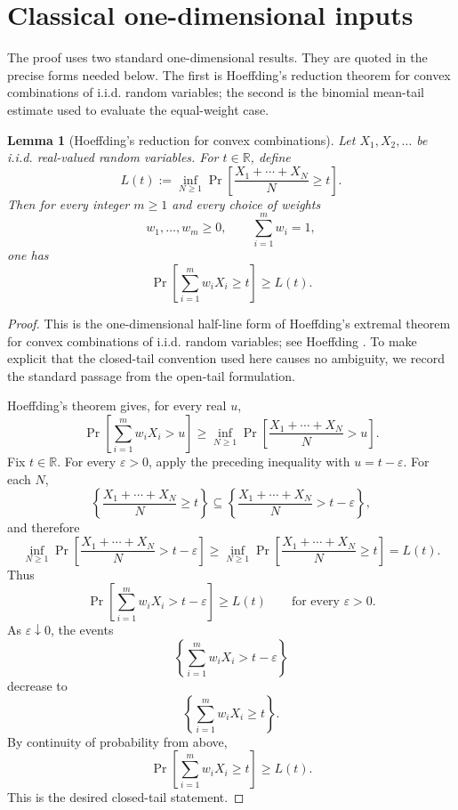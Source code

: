 \documentclass[12pt]{article}
\theoremstyle{definition}
\theoremstyle{plain}
\newtheorem{lemma}[definition]{Lemma}
\theoremstyle{remark}
\begin{document}
\section{Classical one-dimensional inputs}

The proof uses two standard one-dimensional results. They are quoted in the precise forms needed below. The first is Hoeffding's reduction theorem for convex combinations of i.i.d. random variables; the second is the binomial mean-tail estimate used to evaluate the equal-weight case.

\begin{lemma}[Hoeffding's reduction for convex combinations]\label{lem:hoeffding}
Let \(X_1,X_2,\ldots\) be i.i.d. real-valued random variables. For \(t\in\mathbb R\), define
\[
L(t):=\inf_{N\ge1}
\Pr\!\left[\frac{X_1+\cdots+X_N}{N}\ge t\right].
\]
Then for every integer \(m\ge1\) and every choice of weights
\[
w_1,\ldots,w_m\ge0,\qquad \sum_{i=1}^{m}w_i=1,
\]
one has
\[
\Pr\!\left[\sum_{i=1}^{m} w_iX_i\ge t\right]\ge L(t).
\]
\end{lemma}

\begin{proof}
This is the one-dimensional half-line form of Hoeffding's extremal theorem for convex combinations of i.i.d. random variables; see Hoeffding \cite{Hoeffding1955}. To make explicit that the closed-tail convention used here causes no ambiguity, we record the standard passage from the open-tail formulation.

Hoeffding's theorem gives, for every real \(u\),
\[
\Pr\!\left[\sum_{i=1}^{m}w_iX_i>u\right]
\ge
\inf_{N\ge1}
\Pr\!\left[\frac{X_1+\cdots+X_N}{N}>u\right].
\]
Fix \(t\in\mathbb R\). For every \(\varepsilon>0\), apply the preceding inequality with \(u=t-\varepsilon\). For each \(N\),
\[
\left\{\frac{X_1+\cdots+X_N}{N}\ge t\right\}
\subseteq
\left\{\frac{X_1+\cdots+X_N}{N}>t-\varepsilon\right\},
\]
and therefore
\[
\inf_{N\ge1}
\Pr\!\left[\frac{X_1+\cdots+X_N}{N}>t-\varepsilon\right]
\ge
\inf_{N\ge1}
\Pr\!\left[\frac{X_1+\cdots+X_N}{N}\ge t\right]
=L(t).
\]
Thus
\[
\Pr\!\left[\sum_{i=1}^{m}w_iX_i>t-\varepsilon\right]\ge L(t)
\qquad\text{for every }\varepsilon>0.
\]
As \(\varepsilon\downarrow0\), the events
\[
\left\{\sum_{i=1}^{m}w_iX_i>t-\varepsilon\right\}
\]
decrease to
\[
\left\{\sum_{i=1}^{m}w_iX_i\ge t\right\}.
\]
By continuity of probability from above,
\[
\Pr\!\left[\sum_{i=1}^{m}w_iX_i\ge t\right]\ge L(t).
\]
This is the desired closed-tail statement.
\end{proof}
\end{document}
